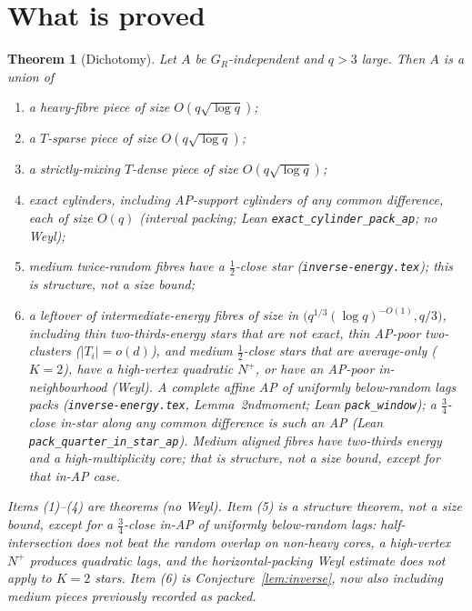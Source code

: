 \documentclass[11pt]{article}
\newtheorem{theorem}{Theorem}
\theoremstyle{definition}
\begin{document}
\section{What is proved}

\begin{theorem}[Dichotomy]\label{thm:dichotomy}
Let $A$ be $G_R$-independent and $q>3$ large.
Then $A$ is a union of
\begin{enumerate}
  \item a heavy-fibre piece of size $O(q\sqrt{\log q})$;
  \item a $T$-sparse piece of size $O(q\sqrt{\log q})$;
  \item a strictly-mixing $T$-dense piece of size $O(q\sqrt{\log q})$;
  \item exact cylinders, including AP-support cylinders of any common
        difference, each of size $O(q)$
        (interval packing; Lean \texttt{exact\_cylinder\_pack\_ap}; no Weyl);
  \item medium twice-random fibres have a $\tfrac12$-close star
        (\texttt{inverse-energy.tex}); this is structure, not a size bound;
  \item a leftover of intermediate-energy fibres of size in
        $\bigl(q^{1/3}(\log q)^{-O(1)},q/3\bigr)$,
        including thin two-thirds-energy stars that are not exact,
        thin AP-poor two-clusters ($|T_i|=o(d)$),
        and medium $\tfrac12$-close stars that are average-only
        ($K=2$), have a high-vertex quadratic $N^+$, or have an
        AP-poor in-neighbourhood (Weyl).
        A complete affine AP of uniformly below-random lags packs
        (\texttt{inverse-energy.tex}, Lemma~2ndmoment; Lean
        \texttt{pack\_window}); a $\tfrac34$-close in-star along any
        common difference is such an AP (Lean
        \texttt{pack\_quarter\_in\_star\_ap}).
        Medium aligned fibres have two-thirds energy
        and a high-multiplicity core; that is structure, not a size
        bound, except for that in-AP case.
\end{enumerate}
Items (1)--(4) are theorems (no Weyl).
Item (5) is a structure theorem, not a size bound, except for a
$\tfrac34$-close in-AP of uniformly below-random lags:
half-intersection does not beat the random overlap on non-heavy cores,
a high-vertex $N^+$ produces quadratic lags, and the
horizontal-packing Weyl estimate does not apply to $K=2$ stars.
Item (6) is Conjecture~\ref{lem:inverse}, now also including medium pieces
previously recorded as packed.
\end{theorem}
\end{document}
